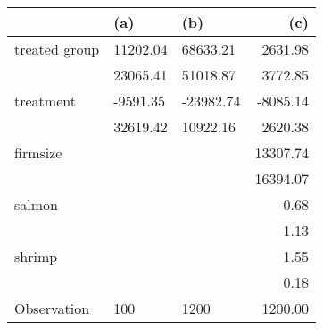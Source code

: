 \begin{tabular}{lllr}
\toprule
{} &       (a) &       (b) &       (c) \\
\midrule
treated group &  11202.04 &  68633.21 &   2631.98 \\
              &  23065.41 &  51018.87 &   3772.85 \\
treatment     &  -9591.35 & -23982.74 &  -8085.14 \\
              &  32619.42 &  10922.16 &   2620.38 \\
firmsize      &           &           &  13307.74 \\
              &           &           &  16394.07 \\
salmon        &           &           &     -0.68 \\
              &           &           &      1.13 \\
shrimp        &           &           &      1.55 \\
              &           &           &      0.18 \\
Observation   &       100 &      1200 &   1200.00 \\
\bottomrule
\end{tabular}
